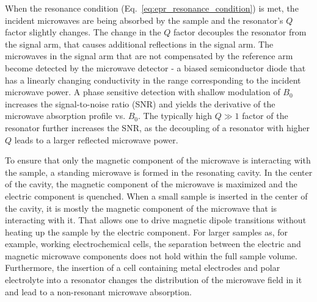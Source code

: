 \par
When the resonance condition (Eq.~\ref{eq:epr_resonance_condition}) is met, the incident microwaves are being absorbed by the sample and the resonator's $Q$ factor slightly changes. The change in the $Q$ factor decouples the resonator from the signal arm, that causes additional reflections in the signal arm. The microwaves in the signal arm that are not compensated by the reference arm become detected by the microwave detector - a biased semiconductor diode that has a linearly changing conductivity in the range corresponding to the incident microwave power. A phase sensitive detection with shallow modulation of $B_0$ increases the signal-to-noise ratio (SNR) and yields the derivative of the microwave absorption profile vs. $B_0$. The typically high $Q\gg1$ factor of the resonator further increases the SNR, as the decoupling of a resonator with higher $Q$ leads to a larger reflected microwave power.

\par
To ensure that only the magnetic component of the microwave is interacting with the sample, a standing microwave is formed in the resonating cavity. In the center of the cavity, the magnetic component of the microwave is maximized and the electric component is quenched. When a small sample is inserted in the center of the cavity, it is mostly the magnetic component of the microwave that is interacting with it. That allows one to drive magnetic dipole transitions without heating up the sample by the electric component. For larger samples as, for example, working electrochemical cells, the separation between the electric and magnetic microwave components does not hold within the full sample volume. Furthermore, the insertion of a cell containing metal electrodes and polar electrolyte into a resonator changes the distribution of the microwave field in it and lead to a non-resonant microwave absorption.


